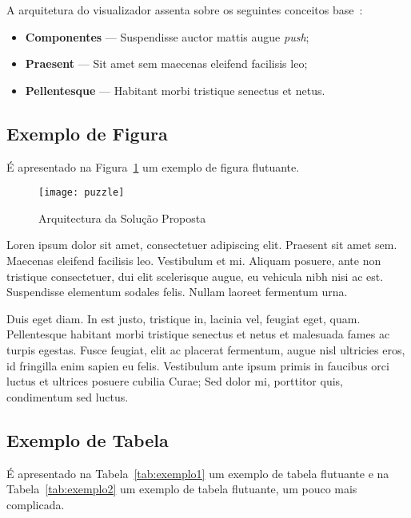 A arquitetura do visualizador assenta sobre os seguintes conceitos
base~\cite{kn:ZPMD97}:

\begin{itemize}
\item \textbf{Componentes} --- Suspendisse auctor mattis augue \emph{push};
\item \textbf{Praesent} --- Sit amet sem maecenas eleifend facilisis leo;
\item \textbf{Pellentesque} --- Habitant morbi tristique senectus et netus.
\end{itemize}

\subsection{Exemplo de Figura}

É apresentado na Figura~\ref{fig:arch} %
um exemplo de figura flutuante.

\begin{figure}[!htpb]
  \begin{center}
    \leavevmode
    \texttt{[image: puzzle]}
    \caption{Arquitectura da Solução Proposta}
    \label{fig:arch}
  \end{center}
\end{figure}

Loren ipsum dolor sit amet, consectetuer adipiscing elit.
Praesent sit amet sem. Maecenas eleifend facilisis leo. Vestibulum et
mi. Aliquam posuere, ante non tristique consectetuer, dui elit
scelerisque augue, eu vehicula nibh nisi ac est. Suspendisse elementum
sodales felis. Nullam laoreet fermentum urna.

Duis eget diam. In est justo, tristique in, lacinia vel, feugiat eget,
quam. Pellentesque habitant morbi tristique senectus et netus et
malesuada fames ac turpis egestas. Fusce feugiat, elit ac placerat
fermentum, augue nisl ultricies eros, id fringilla enim sapien eu
felis. Vestibulum ante ipsum primis in faucibus orci luctus et
ultrices posuere cubilia Curae; Sed dolor mi, porttitor quis,
condimentum sed luctus.

\subsection{Exemplo de Tabela}

É apresentado na Tabela~\ref{tab:exemplo1} um exemplo de tabela
flutuante e na Tabela~\ref{tab:exemplo2} um exemplo de tabela
flutuante, um pouco mais complicada.

